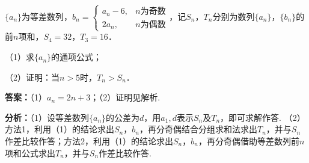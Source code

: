 \begin{question}[points=10]
$\{a_{n}\}$为等差数列，$b_{n}=\begin{cases}a_{n}-6, & n\text{为奇数}\\ 2a_{n}, & n\text{为偶数}\end{cases}$，记$S_{n}$，$T_{n}$分别为数列$\{a_{n}\}$，$\{b_{n}\}$的前$n$项和，$S_{4}=32$，$T_{3}=16$．

（1）求$\{a_{n}\}$的通项公式；

（2）证明：当$n>5$时，$T_{n}>S_{n}$．
\begin{solution}
\textbf{答案：}（1）$a_{n}=2n+3$；（2）证明见解析.

\textbf{分析：}（1）设等差数列$\{a_{n}\}$的公差为$d$，用$a_{1},d$表示$S_{n}$及$T_{n}$，即可求解作答.
（2）方法1，利用（1）的结论求出$S_{n}$，$b_{n}$，再分奇偶结合分组求和法求出$T_{n}$，并与$S_{n}$作差比较作答；方法2，利用（1）的结论求出$S_{n}$，$b_{n}$，再分奇偶借助等差数列前$n$项和公式求出$T_{n}$，并与$S_{n}$作差比较作答.


\end{solution}
\end{question}
